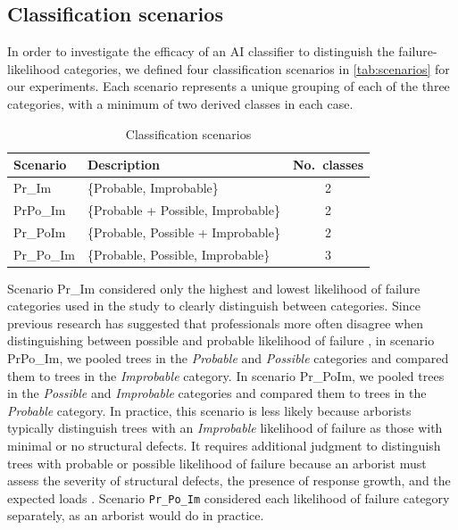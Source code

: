 \documentclass[Journal,letterpaper, SingleSpace, InsideFigs]{ascelike-new}
\begin{document}
\subsection{Classification scenarios}
In order to investigate the efficacy of an AI classifier to distinguish the failure-likelihood categories, we defined four classification scenarios in \autoref{tab:scenarios} for our experiments. 
Each scenario represents a unique grouping of each of the three categories, with a minimum of two derived classes in each case.
\begin{table}[h!]
    \centering
    \begin{tabular}{l l c}\toprule
    \bf Scenario            & \bf Description  & \bf No.\ classes\\\midrule
    Pr\_Im          & \{Probable, Improbable\}           & 2 \\
    PrPo\_Im        & \{Probable + Possible, Improbable\}  & 2 \\
    Pr\_PoIm        & \{Probable, Possible + Improbable\}  & 2 \\
    Pr\_Po\_Im     &  \{Probable, Possible, Improbable\} & 3 \\
    \bottomrule
    \end{tabular}
    \caption{Classification scenarios}
    \label{tab:scenarios}
\end{table}

Scenario Pr\_Im considered only the highest and lowest likelihood of failure categories used in the study to clearly distinguish between categories. Since previous research has suggested that professionals more often disagree when distinguishing between possible and probable likelihood of failure \cite{koeser2020can}, in scenario PrPo\_Im, we pooled trees in the \textit{Probable} and \textit{Possible} categories and compared them to trees in the \textit{Improbable} category. In scenario Pr\_PoIm, we pooled trees in the \textit{Possible} and \textit{Improbable} categories and compared them to trees in the \textit{Probable} category. In practice, this scenario is less likely because arborists typically distinguish trees with an \textit{Improbable} likelihood of failure as those with minimal or no structural defects. It requires additional judgment to distinguish trees with probable or possible likelihood of failure because an arborist must assess the severity of structural defects, the presence of response growth, and the expected loads \cite{smiley2017best}. Scenario \texttt{Pr\_Po\_Im} considered each likelihood of failure category separately, as an arborist would do in practice. 
\end{document}
